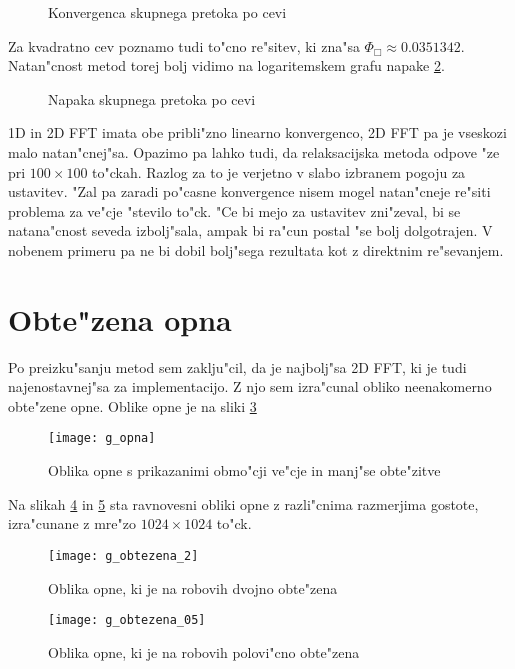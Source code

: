\documentclass[a4paper,10pt]{article}
\begin{document}
\begin{figure}[H]

\caption{Konvergenca skupnega pretoka po cevi}
\label{fig:pretok}  
\end{figure}

Za kvadratno cev poznamo tudi to"cno re"sitev, ki zna"sa $\Phi_\Box \approx 0.0351342$. Natan"cnost metod torej bolj vidimo na logaritemskem grafu napake \ref{fig:pretok-log}. 

\begin{figure}[H]

\caption{Napaka skupnega pretoka po cevi}
\label{fig:pretok-log}  
\end{figure}

1D in 2D FFT imata obe pribli"zno linearno konvergenco, 2D FFT pa je vseskozi malo natan"cnej"sa. Opazimo pa lahko tudi, da relaksacijska metoda odpove "ze pri $100\times 100$ to"ckah. Razlog za to je verjetno v slabo izbranem pogoju za ustavitev.  "Zal pa zaradi po"casne konvergence nisem mogel natan"cneje re"siti problema za ve"cje "stevilo to"ck. "Ce bi mejo za ustavitev zni"zeval, bi se natana"cnost seveda izbolj"sala, ampak bi ra"cun postal "se bolj dolgotrajen. V nobenem primeru pa ne bi dobil bolj"sega rezultata kot z direktnim re"sevanjem. 

\section{Obte"zena opna}

Po preizku"sanju metod sem zaklju"cil, da je najbolj"sa 2D FFT, ki je tudi najenostavnej"sa za implementacijo. Z njo sem izra"cunal obliko neenakomerno obte"zene opne. Oblike opne je na sliki \ref{fig:opna-oblika}

\begin{figure}[H]
\centering
 \texttt{[image: g\_opna]}
 \caption{Oblika opne s prikazanimi obmo"cji ve"cje in manj"se obte"zitve}
 \label{fig:opna-oblika}
\end{figure}

Na slikah \ref{fig:obtezena-2} in \ref{fig:obtezena-05} sta ravnovesni obliki opne z razli"cnima razmerjima gostote, izra"cunane z mre"zo $1024\times 1024$ to"ck. 

\begin{figure}[H]
\centering
 \texttt{[image: g\_obtezena\_2]}
 \caption{Oblika opne, ki je na robovih dvojno obte"zena}
 \label{fig:obtezena-2}
\end{figure}

\begin{figure}[H]
\centering
 \texttt{[image: g\_obtezena\_05]}
 \caption{Oblika opne, ki je na robovih polovi"cno obte"zena}
 \label{fig:obtezena-05}
\end{figure}
\end{document}
